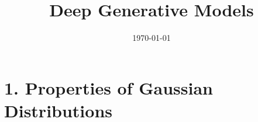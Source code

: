 \documentclass[12pt]{article}
\title{Deep Generative Models}
\date{\today}
\begin{document}
\maketitlepage
\maketitlestart


\section*{1. Properties of Gaussian Distributions}









\clearpage



\end{document}
